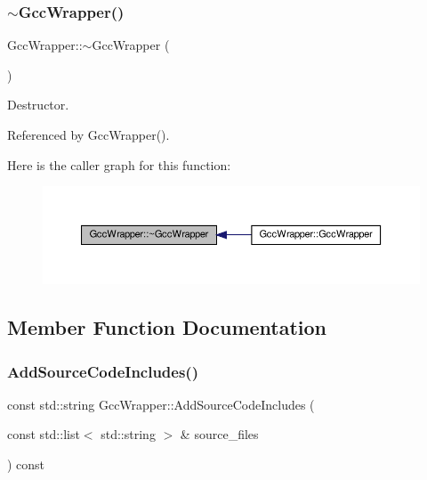 \subsubsection{\texorpdfstring{$\sim$\+Gcc\+Wrapper()}{~GccWrapper()}}
{\footnotesize\ttfamily Gcc\+Wrapper\+::$\sim$\+Gcc\+Wrapper (\begin{DoxyParamCaption}{ }\end{DoxyParamCaption})\hspace{0.3cm}{\ttfamily [default]}}



Destructor. 



Referenced by Gcc\+Wrapper().

Here is the caller graph for this function\+:
\nopagebreak
\begin{figure}[H]
\begin{center}
\leavevmode
\includegraphics[width=350pt]{d4/dbf/classGccWrapper_ab7a6fb46dd178ce5cebe8f4d2f368c3f_icgraph}
\end{center}
\end{figure}


\subsection{Member Function Documentation}
\mbox{\label{classGccWrapper_a7adb23681d3cc41de3bd7063ec636de7}} 
\subsubsection{\texorpdfstring{Add\+Source\+Code\+Includes()}{AddSourceCodeIncludes()}}
{\footnotesize\ttfamily const std\+::string Gcc\+Wrapper\+::\+Add\+Source\+Code\+Includes (\begin{DoxyParamCaption}\item[{const std\+::list$<$ std\+::string $>$ \&}]{source\+\_\+files }\end{DoxyParamCaption}) const\hspace{0.3cm}{\ttfamily [private]}}



